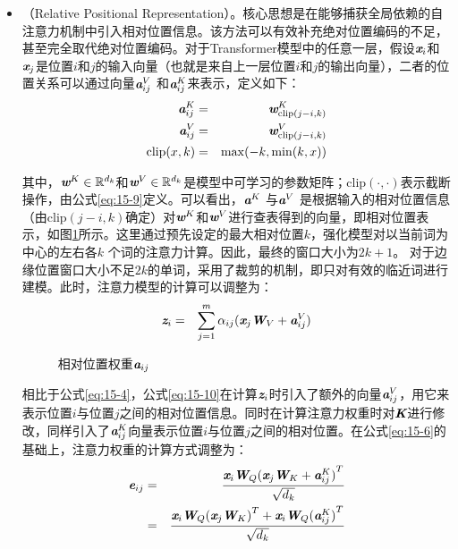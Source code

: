 \begin{itemize}
\vspace{0.5em}
\item {\small{}}（Relative Positional Representation）。核心思想是在能够捕获全局依赖的自注意力机制中引入相对位置信息。该方法可以有效补充绝对位置编码的不足，甚至完全取代绝对位置编码。对于Transformer模型中的任意一层，假设$\textbf{\em x}_i$和$\textbf{\em x}_j$是位置$i$和$j$的输入向量（也就是来自上一层位置$i$和$j$的输出向量），二者的位置关系可以通过向量$\textbf{\em a}_{ij}^V$ 和$\textbf{\em a}_{ij}^K$来表示，定义如下：
\begin{eqnarray}
\textbf{\em a}_{ij}^K &=& \textbf{\em w}^K_{\textrm{clip}(j-i,k)} \label{eq:15-7} \\
\textbf{\em a}_{ij}^V &=& \textbf{\em w}^V_{\textrm{clip}(j-i,k)} \label{eq:15-8} \\
\textrm{clip}(x,k) &=& \max(-k,\min(k,x)) 
\label{eq:15-9}
\end{eqnarray}

\noindent 其中，$\textbf{\em w}^K \in \mathbb{R}^{d_k}$和$\textbf{\em w}^V \in \mathbb{R}^{d_k}$是模型中可学习的参数矩阵；$\textrm{clip}(\cdot,\cdot)$表示截断操作，由公式\eqref{eq:15-9}定义。可以看出，$\textbf{\em a}^K$ 与$\textbf{\em a}^V$ 是根据输入的相对位置信息（由$\textrm{clip}(j-i,k)$确定）对$\textbf{\em w}^K$和$\textbf{\em w}^V$进行查表得到的向量，即相对位置表示，如图\ref{fig:15-2}所示。这里通过预先设定的最大相对位置$k$，强化模型对以当前词为中心的左右各$k$ 个词的注意力计算。因此，最终的窗口大小为$2k + 1$。 对于边缘位置窗口大小不足$2k$的单词，采用了裁剪的机制，即只对有效的临近词进行建模。此时，注意力模型的计算可以调整为：
\begin{eqnarray}
\textbf{\em z}_{i} &=& \sum_{j=1}^m \alpha_{ij}(\textbf{\em x}_j \textbf{\em W}_V + \textbf{\em a}_{ij}^V)
\label{eq:15-10}
\end{eqnarray}

\begin{figure}[htp]
\centering
\vspace{-1em}

\caption{相对位置权重$\textbf{\em a}_{ij}$}
\setlength{\belowcaptionskip}{-2em}
\label{fig:15-2}
\end{figure}

\noindent 相比于公式\eqref{eq:15-4}，公式\eqref{eq:15-10}在计算$\textbf{\em z}_i$时引入了额外的向量$\textbf{\em a}_{ij}^V$，用它来表示位置$i$与位置$j$之间的相对位置信息。同时在计算注意力权重时对$\textbf{\em K}$进行修改，同样引入了$\textbf{\em a}_{ij}^K$向量表示位置$i$与位置$j$之间的相对位置。在公式\eqref{eq:15-6}的基础上，注意力权重的计算方式调整为：
\begin{eqnarray}
\textbf{\em e}_{ij} &=& \frac{\textbf{\em x}_i \textbf{\em W}_Q{(\textbf{\em x}_j \textbf{\em W}_K + \textbf{\em a}_{ij}^K )}^{T}}{\sqrt{d_k}} \nonumber \\
&=& \frac{\textbf{\em x}_i \textbf{\em W}_Q{(\textbf{\em x}_j \textbf{\em W}_K)}^{T} + \textbf{\em x}_i \textbf{\em W}_Q{(\textbf{\em a}_{ij}^K )}^{T}}{\sqrt{d_k}}
\label{eq:15-11}
\end{eqnarray}


\end{itemize}
